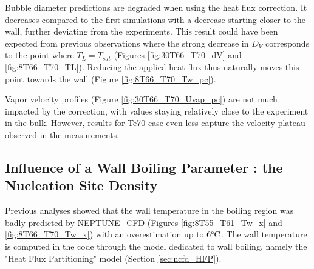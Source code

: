 \npar

Bubble diameter predictions are degraded when using the heat flux correction. It decreases compared to the first simulations with a decrease starting closer to the wall, further deviating from the experiments. This result could have been expected from previous observations where the strong decrease in $D_{V}$ corresponds to the point where $T_{L}=T_{sat}$ (Figures \ref{fig:30T66_T70_dV} and \ref{fig:8T66_T70_TL}). Reducing the applied heat flux thus naturally moves this point towards the wall (Figure \ref{fig:8T66_T70_Tw_pc}).

\npar

Vapor velocity profiles (Figure \ref{fig:30T66_T70_Uvap_pc}) are not much impacted by the correction, with values staying relatively close to the experiment in the bulk. However, results for Te70 case even less capture the velocity plateau observed in the measurements. 


%
%
%




%


\subsection{Influence of a Wall Boiling Parameter : the Nucleation Site Density}


Previous analyses showed that the wall temperature in the boiling region was badly predicted by NEPTUNE\_CFD (Figures \ref{fig:8T55_T61_Tw_x} and \ref{fig:8T66_T70_Tw_x}) with an overestimation up to $6\degree\mathrm{C}$. The wall temperature is computed in the code through the model dedicated to wall boiling, namely the "Heat Flux Partitioning" model (Section \ref{sec:ncfd_HFP}).  


